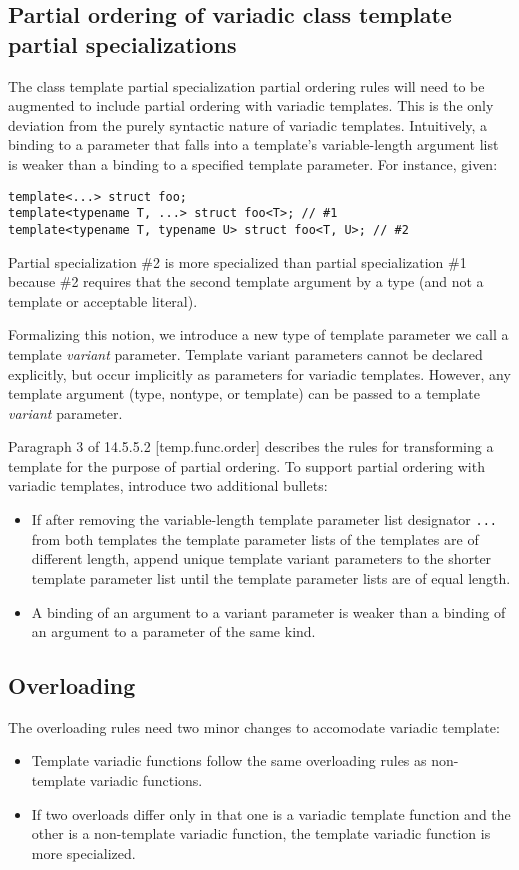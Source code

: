 \documentclass{article}
\begin{document}
\subsection{Partial ordering of variadic class template partial specializations}
The class template partial specialization partial ordering rules will
need to be augmented to include partial ordering with variadic
templates. This is the only deviation from the purely syntactic nature
of variadic templates. Intuitively, a binding to a parameter that
falls into a template's variable-length argument list is weaker than a
binding to a specified template parameter. For instance, given:

\begin{verbatim}
template<...> struct foo;
template<typename T, ...> struct foo<T>; // #1
template<typename T, typename U> struct foo<T, U>; // #2
\end{verbatim}

Partial specialization \#2 is more specialized than partial
specialization \#1 because \#2 requires that the second template
argument by a type (and not a template or acceptable
literal). 

Formalizing this notion, we introduce a new type of template
parameter we call a template {\em variant} parameter. Template variant
parameters cannot be declared explicitly, but occur implicitly as
parameters for variadic templates. However, any template argument
(type, nontype, or template) can be passed to a template {\em variant}
parameter. 

Paragraph 3 of 14.5.5.2 [temp.func.order] describes the rules for
transforming a template for the purpose of partial ordering. To
support partial ordering with variadic templates, introduce two
additional bullets:
\begin{itemize}
\item If after removing the variable-length template parameter list
  designator \verb|...| from both templates the template parameter lists of the
  templates are of different length, append unique template variant
  parameters to the shorter template parameter list until the template
  parameter lists are of equal length.
\item A binding of an argument to a variant parameter is weaker than a
  binding of an argument to a parameter of the same kind.
\end{itemize}

\subsection{Overloading}
\label{overloading}
The overloading rules need two minor changes to accomodate variadic template:
\begin{itemize}
\item Template variadic functions follow the same overloading rules as
  non-template variadic functions.
\item If two overloads differ only in that one is a variadic template
  function and the other is a non-template variadic function, the
  template variadic function is more specialized.
\end{itemize}
\end{document}
